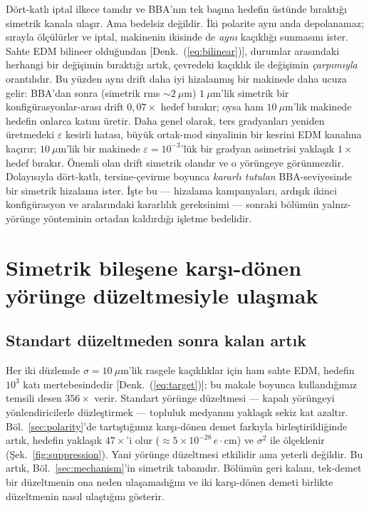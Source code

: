 \documentclass[aps,prab,reprint,superscriptaddress,nofootinbib]{revtex4-2}
\begin{document}
Dört-katlı iptal ilkece tamdır ve BBA'nın tek başına hedefin üstünde bıraktığı
simetrik kanala ulaşır. Ama bedelsiz değildir. İki polarite aynı anda depolanamaz;
sırayla ölçülürler ve iptal, makinenin ikisinde de \emph{aynı} kaçıklığı sunmasını
ister. Sahte EDM bilineer olduğundan [Denk.~(\ref{eq:bilinear})], durumlar
arasındaki herhangi bir değişimin bıraktığı artık, çevredeki kaçıklık ile değişimin
\emph{çarpımıyla} orantılıdır. Bu yüzden aynı drift daha iyi hizalanmış bir makinede
daha ucuza gelir: BBA'dan sonra (simetrik rms $\sim\!2~\mu$m) $1~\mu$m'lik simetrik
bir konfigürasyonlar-arası drift $0{,}07\times$ hedef bırakır; oysa ham $10~\mu$m'lik
makinede hedefin onlarca katını üretir. Daha genel olarak, ters gradyanları yeniden
üretmedeki $\varepsilon$ kesirli hatası, büyük ortak-mod sinyalinin bir kesrini EDM
kanalına kaçırır; $10~\mu$m'lik bir makinede $\varepsilon=10^{-3}$'lük bir gradyan
asimetrisi yaklaşık $1\times$ hedef bırakır. Önemli olan drift simetrik olandır ve
o yörüngeye görünmezdir. Dolayısıyla dört-katlı, tersine-çevirme boyunca
\emph{kararlı tutulan} BBA-seviyesinde bir simetrik hizalama ister. İşte bu ---
hizalama kampanyaları, ardışık ikinci konfigürasyon ve aralarındaki kararlılık
gereksinimi --- sonraki bölümün yalnız-yörünge yönteminin ortadan kaldırdığı işletme
bedelidir.


\section{Simetrik bileşene karşı-dönen yörünge düzeltmesiyle ulaşmak}
\label{sec:orbitreach}

\subsection{Standart düzeltmeden sonra kalan artık}
\label{sec:chain}

Her iki düzlemde $\sigma = 10~\mu$m'lik rasgele kaçıklıklar için ham sahte EDM,
hedefin $10^{3}$ katı mertebesindedir [Denk.~(\ref{eq:target})]; bu makale boyunca
kullandığımız temsili desen $356\times$ verir. Standart yörünge düzeltmesi ---
kapalı yörüngeyi yönlendiricilerle düzleştirmek --- topluluk medyanını yaklaşık
sekiz kat azaltır. Böl.~\ref{sec:polarity}'de tartıştığımız karşı-dönen demet
farkıyla birleştirildiğinde artık, hedefin yaklaşık $47\times$'i olur
($\approx 5\times10^{-28}\,e\!\cdot\!$cm) ve $\sigma^{2}$ ile ölçeklenir
(Şek.~\ref{fig:suppression}). Yani yörünge düzeltmesi etkilidir ama yeterli değildir.
Bu artık, Böl.~\ref{sec:mechanism}'in simetrik tabanıdır. Bölümün geri kalanı,
tek-demet bir düzeltmenin ona neden ulaşamadığını ve iki karşı-dönen demeti birlikte
düzeltmenin nasıl ulaştığını gösterir.
\end{document}
